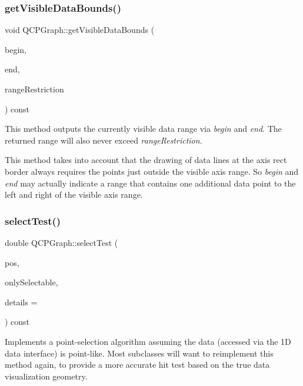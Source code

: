 \subsubsection{\texorpdfstring{get\+Visible\+Data\+Bounds()}{getVisibleDataBounds()}}
{\footnotesize\ttfamily void Q\+C\+P\+Graph\+::get\+Visible\+Data\+Bounds (\begin{DoxyParamCaption}\item[{Q\+C\+P\+Graph\+Data\+Container\+::const\+\_\+iterator \&}]{begin,  }\item[{Q\+C\+P\+Graph\+Data\+Container\+::const\+\_\+iterator \&}]{end,  }\item[{const \hyperlink{class_q_c_p_data_range}{Q\+C\+P\+Data\+Range} \&}]{range\+Restriction }\end{DoxyParamCaption}) const\hspace{0.3cm}{\ttfamily [protected]}}

This method outputs the currently visible data range via {\itshape begin} and {\itshape end}. The returned range will also never exceed {\itshape range\+Restriction}.

This method takes into account that the drawing of data lines at the axis rect border always requires the points just outside the visible axis range. So {\itshape begin} and {\itshape end} may actually indicate a range that contains one additional data point to the left and right of the visible axis range. \mbox{\label{class_q_c_p_graph_a6d669d04462d272c6aa0e5f85846d673}} 
\subsubsection{\texorpdfstring{select\+Test()}{selectTest()}}
{\footnotesize\ttfamily double Q\+C\+P\+Graph\+::select\+Test (\begin{DoxyParamCaption}\item[{const Q\+PointF \&}]{pos,  }\item[{bool}]{only\+Selectable,  }\item[{Q\+Variant $\ast$}]{details = {} }\end{DoxyParamCaption}) const\hspace{0.3cm}{\ttfamily [virtual]}}

Implements a point-\/selection algorithm assuming the data (accessed via the 1D data interface) is point-\/like. Most subclasses will want to reimplement this method again, to provide a more accurate hit test based on the true data visualization geometry.

